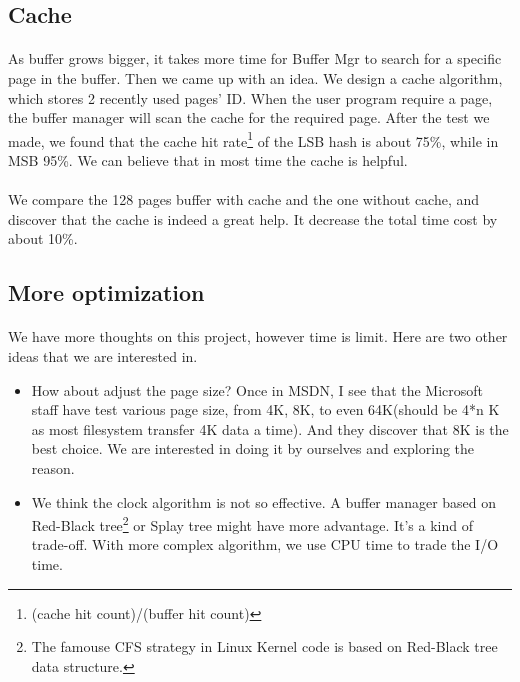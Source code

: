 \documentclass[a4paper, 12pt]{article}
\begin{document}
    \subsection{Cache}
        \paragraph{}
            As buffer grows bigger, it takes more time for Buffer Mgr to search for a specific page in the buffer. Then we came up with an idea. We design a cache algorithm, which stores 2 recently used pages' ID. When the user program require a page, the buffer manager will scan the cache for the required page. After the test we made, we found that the cache hit rate\footnote{(cache hit count)/(buffer hit count)} of the LSB hash is about 75\%, while in MSB 95\%. We can believe that in most time the cache is helpful. 
        \paragraph{}
            We compare the 128 pages buffer with cache and the one without cache, and discover that the cache is indeed a great help. It decrease the total time cost by about 10\%.
    \subsection{More optimization}
        \paragraph{}
            We have more thoughts on this project, however time is limit. Here are two other ideas that we are interested in.
        \begin{itemize}
            \item How about adjust the page size? Once in MSDN, I see that the Microsoft staff have test various page size, from 4K, 8K, to even 64K(should be 4*n K as most filesystem transfer 4K data a time). And they discover that 8K is the best choice. We are interested in doing it by ourselves and exploring the reason.
            \item We think the clock algorithm is not so effective. A buffer manager based on Red-Black tree\footnote{The famouse CFS strategy in Linux Kernel code is based on Red-Black tree data structure.} or Splay tree might have more advantage. It's a kind of trade-off. With more complex algorithm, we use CPU time to trade the I/O time.
        \end{itemize}
\end{document}
